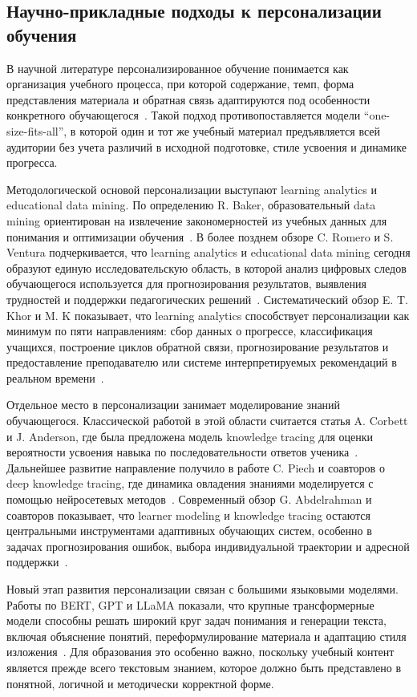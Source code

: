 \documentclass[a4paper,12pt]{extarticle}
\begin{document}
\subsection{Научно-прикладные подходы к персонализации обучения}

В научной литературе персонализированное обучение понимается как организация учебного процесса, при которой содержание, темп, форма представления материала и обратная связь адаптируются под особенности конкретного обучающегося~\cite{khor2024la}. Такой подход противопоставляется модели ``one-size-fits-all'', в которой один и тот же учебный материал предъявляется всей аудитории без учета различий в исходной подготовке, стиле усвоения и динамике прогресса.

Методологической основой персонализации выступают learning analytics и educational data mining. По определению R. Baker, образовательный data mining ориентирован на извлечение закономерностей из учебных данных для понимания и оптимизации обучения~\cite{baker2010edm}. В более позднем обзоре C. Romero и S. Ventura подчеркивается, что learning analytics и educational data mining сегодня образуют единую исследовательскую область, в которой анализ цифровых следов обучающегося используется для прогнозирования результатов, выявления трудностей и поддержки педагогических решений~\cite{romero2020edm}. Систематический обзор E. T. Khor и M. K показывает, что learning analytics способствует персонализации как минимум по пяти направлениям: сбор данных о прогрессе, классификация учащихся, построение циклов обратной связи, прогнозирование результатов и предоставление преподавателю или системе интерпретируемых рекомендаций в реальном времени~\cite{khor2024la}.

Отдельное место в персонализации занимает моделирование знаний обучающегося. Классической работой в этой области считается статья A. Corbett и J. Anderson, где была предложена модель knowledge tracing для оценки вероятности усвоения навыка по последовательности ответов ученика~\cite{corbett1994kt}. Дальнейшее развитие направление получило в работе C. Piech и соавторов о deep knowledge tracing, где динамика овладения знаниями моделируется с помощью нейросетевых методов~\cite{piech2015dkt}. Современный обзор G. Abdelrahman и соавторов показывает, что learner modeling и knowledge tracing остаются центральными инструментами адаптивных обучающих систем, особенно в задачах прогнозирования ошибок, выбора индивидуальной траектории и адресной поддержки~\cite{abdelrahman2023ktsurvey}.

Новый этап развития персонализации связан с большими языковыми моделями. Работы по BERT, GPT и LLaMA показали, что крупные трансформерные модели способны решать широкий круг задач понимания и генерации текста, включая объяснение понятий, переформулирование материала и адаптацию стиля изложения~\cite{devlin2019bert,brown2020gpt3,touvron2023llama}. Для образования это особенно важно, поскольку учебный контент является прежде всего текстовым знанием, которое должно быть представлено в понятной, логичной и методически корректной форме.
\end{document}
